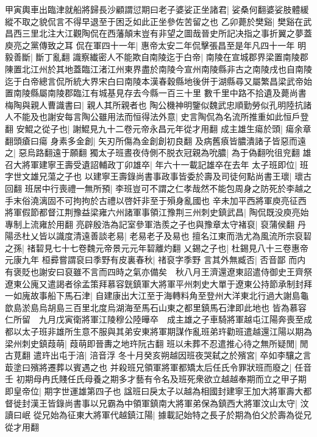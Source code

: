 甲寅輿車出臨津就船將歸長沙顧謂愆期曰老子婆娑正坐諸君|{
	娑桑何翻婆娑肢體緩縱不取之貌侃言不得早退至于困乏如此正坐參佐苦留之也}
乙卯薨於樊谿|{
	樊谿在武昌西三里北注大江觀陶侃在西藩顛末豈有非望之圖哉晉史所記决指之事折翼之夢蓋庾亮之黨傳致之耳}
侃在軍四十一年|{
	惠帝太安二年侃擊張昌至是年凡四十一年}
明毅善斷|{
	斷丁亂翻}
識察纎密人不能欺自南陵迄于白帝|{
	南陵在宣城郡界梁置南陵郡陳置北江州於其地蓋臨江渚江州東界盡於南陵今宣州南陵縣非古之南陵戌也自南陵迄于白帝總言侃所統大界宋白曰南陵本漢春穀縣地後併于湖縣尋又屬繁昌梁武帝始置南陵縣屬南陵郡臨江有城基見存去今縣一百三十里}
數千里中路不拾遺及薨尚書梅陶與親人曹識書曰|{
	親人其所親者也}
陶公機神明鑒似魏武忠順勤勞似孔明陸抗諸人不能及也謝安每言陶公雖用法而恒得法外意|{
	史言陶侃為名流所推重如此恒戶登翻}
安鯤之從子也|{
	謝鯤見九十二卷元帝永昌元年從才用翻}
成主雄生瘍於頭|{
	瘍余章翻頭瘡曰瘍}
身素多金創|{
	矢刃所傷為金創創初良翻}
及病舊㾗皆膿潰諸子皆惡而遠之|{
	惡烏路翻遠于願翻}
獨太子班晝夜侍側不脱衣冠親為吮膿|{
	為于偽翻吮徂兖翻}
雄召大將軍建寧王壽受遺詔輔政丁卯雄卒|{
	年六十一載記雄卒在去年}
太子班即位|{
	班字世文雄兄蕩之子也}
以建寧王壽錄尚書事政事皆委於壽及司徒何點尚書王瓌|{
	瓌古回翻}
班居中行喪禮一無所預|{
	李班豈可不謂之仁孝哉然不能包周身之防死於李越之手末俗澆漓固不可拘拘於古禮以啓奸非至于殞身亂國也}
辛未加平西將軍庾亮征西將軍假節都督江荆豫益梁雍六州諸軍事領江豫荆三州刺史鎮武昌|{
	陶侃既没庾亮始專制上流雍於用翻}
亮辟殷浩為記室參軍浩羨之子也與豫章太守褚裒|{
	裒蒲侯翻}
丹陽丞杜乂皆以識度清遠善談老易|{
	老易老子及易也}
擅名江東而浩尤為風流所宗裒䂮之孫|{
	禇䂮見七十七卷魏元帝景元元年䂮離灼翻}
乂錫之子也|{
	杜錫見八十三卷惠帝元康九年}
桓彛嘗謂裒曰季野有皮裏春秋|{
	禇裒字季野}
言其外無臧否|{
	否音鄙}
而内有褒貶也謝安曰裒雖不言而四時之氣亦備矣　秋八月王濟還遼東詔遣侍御史王齊祭遼東公廆又遣謁者徐孟策拜慕容皝鎮軍大將軍平州刺史大單于遼東公持節承制封拜一如廆故事船下馬石津|{
	自建康出大江至于海轉料角至登州大洋東北行過大謝島龜歆島淤島烏胡島三百里北度烏湖海至馬石山東之都里鎮馬石津即此地也}
皆為慕容仁所留　九月戊寅衛將軍江陵穆公陸曄卒　成主雄之子車騎將軍越屯江陽奔喪至成都以太子班非雄所生意不服與其弟安東將軍期謀作亂班弟玝勸班遣越還江陽以期為梁州刺史鎮葭萌|{
	葭萌即晉夀之地玝阮古翻}
班以未葬不忍遣推心待之無所疑閒|{
	閒古莧翻}
遣玝出屯于涪|{
	涪音浮}
冬十月癸亥朔越因班夜哭弑之於殯宮|{
	卒如李驤之言菆塗曰殯將遷葬以賓遇之也}
并殺班兄領軍將軍都矯太后任氏令罪狀班而廢之|{
	任音壬}
初期母冉氏賤任氏母養之期多才藝有令名及班死衆欲立越越奉期而立之甲子期即皇帝位|{
	期字世運雄第四子也}
諡班曰戾太子以越為相國封建寧王加大將軍壽大都督徙封漢王皆錄尚書事以兄霸為中領軍鎮南大將軍弟保為鎮西大將軍汶山太守|{
	汶讀曰岷}
從兄始為征東大將軍代越鎮江陽|{
	據載記始特之長子於期為伯父於壽為從兄從才用翻}
